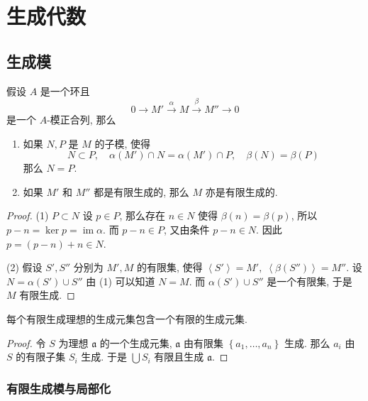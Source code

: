\chapter{生成代数}

\section{生成模}

\begin{proposition}
  \label{proposition-exact-squence-middle-submodules-equality}
  假设 \( A \) 是一个环且
  \[
    0 \to M' \xrightarrow{\alpha} M \xrightarrow{\beta} M'' \to 0
  \]
  是一个 \( A \)-模正合列, 那么
  \begin{enumerate}
    \item 如果 \( N, P \) 是 \( M \) 的子模, 使得
      \[
        N \subset P,\quad \alpha(M') \cap N = \alpha(M') \cap P,\quad \beta(N) =
        \beta(P)
      \]
      那么 \( N = P \).
    \item 如果 \( M' \) 和 \( M'' \) 都是有限生成的, 那么 \( M \)
      亦是有限生成的.
  \end{enumerate}
\end{proposition}
\begin{proof}
  (1) \( P \subset N \)
  设 \( p \in P \), 那么存在 \( n \in N \) 使得 \( \beta(n) = \beta(p) \), 所以
  \( p - n = \operatorname{ker} p = \operatorname{im} \alpha \).
  而 \( p - n \in P \), 又由条件 \( p - n \in N \). 因此 \( p = (p - n) + n
  \in N \).

  (2) 假设 \( S', S'' \) 分别为 \( M', M \) 的有限集, 使得 \( \left\langle {S'}
  \right\rangle = M',\; \left\langle \beta (S'') \right\rangle = M'' \).
  设 \( N = \alpha(S') \cup S'' \) 由 (1) 可以知道 \( N = M \).
  而 \( \alpha(S') \cup S'' \) 是一个有限集, 于是 \( M \) 有限生成.
\end{proof}

\begin{lemma}
  每个有限生成理想的生成元集包含一个有限的生成元集.
\end{lemma}
\begin{proof}
  令 \( S \) 为理想 \( \mathfrak{a} \) 的一个生成元集, \( \mathfrak{a} \)
  由有限集 \( \left\lbrace a_1, \ldots, a_n \right\rbrace \) 生成. 那么 \( a_i
  \) 由 \( S \) 的有限子集 \( S_i \) 生成.
  于是 \( \bigcup S_i \) 有限且生成 \( \mathfrak{a} \).
\end{proof}

\subsection{有限生成模与局部化}

